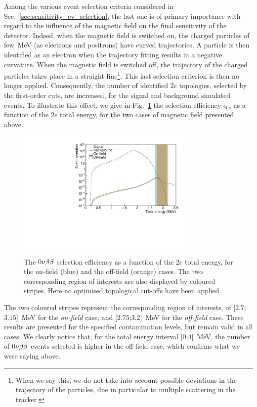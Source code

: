 Among the various event selection criteria considered in Sec.~\ref{sec:sensitivity_ev_selection}, the last one is of primary importance with regard to the influence of the magnetic field on the final sensitivity of the detector.
Indeed, when the magnetic field is switched on, the charged particles of few~MeV (as electrons and positrons) have curved trajectories.
A particle is then identified as an electron when the trajectory fitting results in a negative curvature.
When the magnetic field is switched off, the trajectory of the charged particles takes place in a straight line\footnote{When we say this, we do not take into account possible deviations in the trajectory of the particles, due in particular to multiple scattering in the tracker.}.
This last selection criterion is then no longer applied.
Consequently, the number of identified $2e$ topologies, selected by the first-order cuts, are increased, for the signal and background simulated events.
To illustrate this effect, we give in Fig.~\ref{fig:eff_0nu_w_wo_B} the selection efficiency $\epsilon_{0\nu}$ as a function of the $2e$ total energy, for the two cases of magnetic field presented above.
\begin{figure}[h]
  \centering
  \includegraphics[width=0.8\textwidth]{Sensitivity/fig_sensitivity/Nbkg_field.pdf}
  \caption{The $0\nu\beta\beta$ selection efficiency as a function of the $2e$ total energy, for the on-field (blue) and the off-field (orange) cases.
    The two corresponding region of interests are also displayed by coloured stripes.
    Here no optimised topological cut-offs have been applied.
    \label{fig:eff_0nu_w_wo_B}}
\end{figure}
The two coloured stripes represent the corresponding region of interests, of [$2.7$;$3.15$]~MeV for the \emph{on-field} case, and [$2.75$;$3.2$]~MeV for the \emph{off-field} case.
These results are presented for the specified contamination levels, but remain valid in all cases.
We clearly notice that, for the total energy interval [$0$;$4$]~MeV, the number of $0\nu\beta\beta$ events selected is higher in the off-field case, which confirms what we were saying above.


